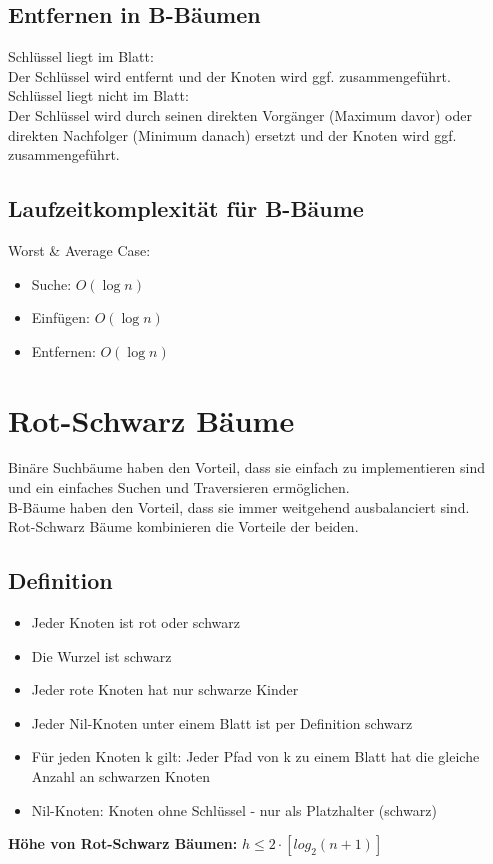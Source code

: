 \documentclass{scrreprt}
\begin{document}
\subsection{Entfernen in B-Bäumen}
Schlüssel liegt im Blatt:
\\ Der Schlüssel wird entfernt und der Knoten wird ggf. zusammengeführt.
\\Schlüssel liegt nicht im Blatt:
\\ Der Schlüssel wird durch seinen direkten Vorgänger (Maximum davor) oder direkten Nachfolger (Minimum danach) ersetzt und der Knoten wird ggf. zusammengeführt.
\subsection{Laufzeitkomplexität für B-Bäume}
Worst \& Average Case:
\begin{itemize}
  \item Suche: $O(\log n)$
  \item Einfügen: $O(\log n)$
  \item Entfernen: $O(\log n)$
\end{itemize}
\section{Rot-Schwarz Bäume}
Binäre Suchbäume haben den Vorteil, dass sie einfach zu implementieren sind und ein einfaches Suchen und Traversieren ermöglichen.
\\B-Bäume haben den Vorteil, dass sie immer weitgehend ausbalanciert sind.
\\Rot-Schwarz Bäume kombinieren die Vorteile der beiden.
\subsection{Definition}
\begin{itemize}
  \item Jeder Knoten ist rot oder schwarz
  \item Die Wurzel ist schwarz
  \item Jeder rote Knoten hat nur schwarze Kinder
  \item Jeder Nil-Knoten unter einem Blatt ist per Definition schwarz
  \item Für jeden Knoten k gilt: Jeder Pfad von k zu einem Blatt hat die gleiche Anzahl an schwarzen Knoten
  \item Nil-Knoten: Knoten ohne Schlüssel - nur als Platzhalter (schwarz)
\end{itemize}
\textbf{Höhe von Rot-Schwarz Bäumen:} $h \leq 2 \cdot [log_2(n+1)]$
\end{document}
